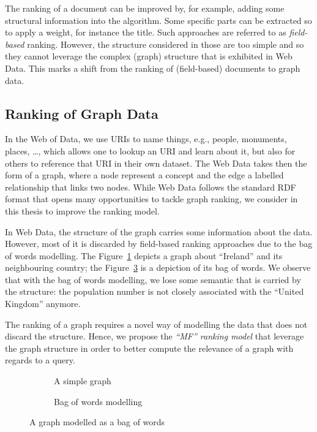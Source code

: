 The ranking of a document can be improved by, for example, adding some structural information into the algorithm. Some specific parts can be extracted so to apply a weight, for instance the title. Such approaches are referred to as \emph{field-based} ranking. However, the structure considered in those are too simple and so they cannot leverage the complex (graph) structure that is exhibited in Web Data. This marks a shift from the ranking of (field-based) documents to graph data.

\subsection{Ranking of Graph Data}

In the Web of Data, we use URIs to name things, e.g., people, monuments, places, \ldots, which allows one to lookup an URI and learn about it, but also for others to reference that URI in their own dataset. The Web Data takes then the form of a graph, where a node represent a concept and the edge a labelled relationship that links two nodes.
While Web Data follows the standard RDF format that opens many opportunities to tackle graph ranking, we consider in this thesis to improve the ranking model.

In Web Data, the structure of the graph carries some information about the data. However, most of it is discarded by field-based ranking approaches due to the bag of words modelling. The Figure~\ref{fig:bow-graph} depicts a  graph about ``Ireland'' and its neighbouring country; the Figure~\ref{fig:bow} is a depiction of its bag of words. We observe that with the bag of words modelling, we lose some semantic that is carried by the structure: the population number is not closely associated with the ``United Kingdom'' anymore.

The ranking of a graph requires a novel way of modelling the data that does not discard the structure.
Hence, we propose the \emph{``MF'' ranking model} that leverage the graph structure in order to better compute the relevance of a graph with regards to a query.

\begin{figure}
	\centering
	\begin{subfigure}[b]{0.45\textwidth}
		\centering
		\resizebox{\textwidth}{!}{
			
		}
		\caption{A simple graph}
		\label{fig:bow-graph}
	\end{subfigure}
	\qquad
	\begin{subfigure}[b]{0.45\textwidth}
		\centering
		\resizebox{\textwidth}{!}{
			
		}
		\caption{Bag of words modelling}
		\label{fig:bow}
	\end{subfigure}
	\caption{A graph modelled as a bag of words}
\end{figure}

